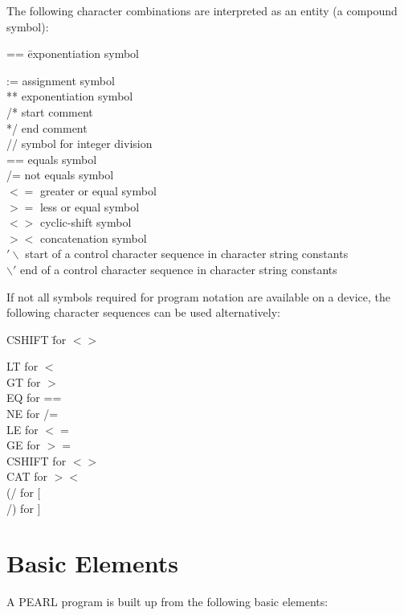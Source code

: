 The following character combinations are interpreted as an entity (a
compound symbol):

\begin{tabbing}
== \= exponentiation symbol \kill

:=    \> assignment symbol\\ \relax
**    \> exponentiation symbol\\
/*    \> start comment\\ \relax
*/    \> end comment\\
//    \> symbol for integer division\\
==    \> equals symbol\\
/=    \> not equals symbol\\
$<=$  \> greater or equal symbol\\
$>=$  \> less or equal symbol\\
$<>$  \> cyclic-shift symbol\\
$><$  \> concatenation symbol\\
$'\backslash$ \> start of a control character sequence in character string constants\\
$\backslash'$ \> end of a control character sequence in character string constants
\end{tabbing}

If not all symbols required for program notation are available on a
device, the following character sequences can be used alternatively:

\begin{tabbing}
CSHIFT \= for $<>$ \kill

LT     \> for $<$\\
GT     \> for $>$\\
EQ     \> for ==\\
NE     \> for /=\\
LE     \> for $<=$\\
GE     \> for $>=$\\
CSHIFT \> for $<>$\\
CAT    \> for $><$\\
(/     \> for $[$\\
/)     \> for $]$\\
\end{tabbing}

\section{Basic Elements}    %

A PEARL program is built up from the following basic elements:

